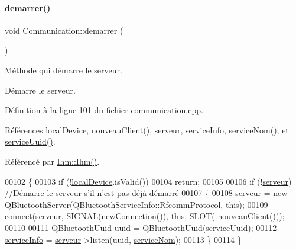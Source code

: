 \paragraph{\texorpdfstring{demarrer()}{demarrer()}}
{\footnotesize\ttfamily void Communication\+::demarrer (\begin{DoxyParamCaption}{ }\end{DoxyParamCaption})}



Méthode qui démarre le serveur. 

Démarre le serveur. 

Définition à la ligne \hyperlink{communication_8cpp_source_l00101}{101} du fichier \hyperlink{communication_8cpp_source}{communication.\+cpp}.



Références \hyperlink{communication_8h_source_l00096}{local\+Device}, \hyperlink{communication_8cpp_source_l00150}{nouveau\+Client()}, \hyperlink{communication_8h_source_l00094}{serveur}, \hyperlink{communication_8h_source_l00097}{service\+Info}, \hyperlink{communication_8h_a28fc73dd6a464ea3a1cdb210ee7a1925}{service\+Nom()}, et \hyperlink{communication_8h_a50c84e57d8bf82d8048cc731a5679b64}{service\+Uuid()}.



Référencé par \hyperlink{ihm_8cpp_source_l00026}{Ihm\+::\+Ihm()}.


\begin{DoxyCode}
00102 \{
00103     \textcolor{keywordflow}{if} (!\hyperlink{class_communication_a6281796eab7523bef6be1a766e0e906f}{localDevice}.isValid())
00104         \textcolor{keywordflow}{return};
00105 
00106     \textcolor{keywordflow}{if} (!\hyperlink{class_communication_a6384747297d6efa9e8fd2fc79ed0c269}{serveur})   \textcolor{comment}{//Démarre le serveur s'il n'est pas déjà démarré}
00107     \{
00108         \hyperlink{class_communication_a6384747297d6efa9e8fd2fc79ed0c269}{serveur} = \textcolor{keyword}{new} QBluetoothServer(QBluetoothServiceInfo::RfcommProtocol, \textcolor{keyword}{this});
00109         connect(\hyperlink{class_communication_a6384747297d6efa9e8fd2fc79ed0c269}{serveur}, SIGNAL(newConnection()), \textcolor{keyword}{this}, SLOT(
      \hyperlink{class_communication_ac1bc22603b6e05389f94890b745aac4f}{nouveauClient}()));
00110 
00111         QBluetoothUuid uuid = QBluetoothUuid(\hyperlink{communication_8h_a50c84e57d8bf82d8048cc731a5679b64}{serviceUuid});
00112         \hyperlink{class_communication_aa7f9ee5e5d90336a56857ebc229e4274}{serviceInfo} = \hyperlink{class_communication_a6384747297d6efa9e8fd2fc79ed0c269}{serveur}->listen(uuid, \hyperlink{communication_8h_a28fc73dd6a464ea3a1cdb210ee7a1925}{serviceNom});
00113     \}
00114 \}
\end{DoxyCode}
\mbox{\label{class_communication_a33db5c9db5da71c20c8c544d1de4eb9a}} 

